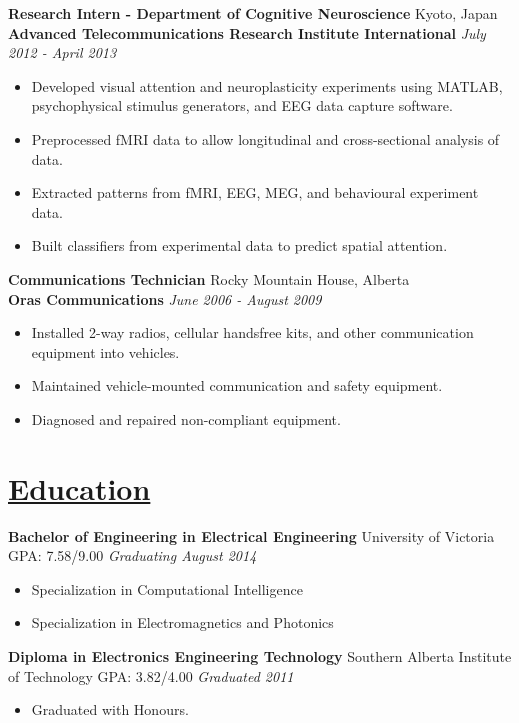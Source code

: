 \documentclass[a4paper, 11pt]{article}
\begin{document}
  \textbf{Research Intern - Department of Cognitive Neuroscience}
  \hfill
  Kyoto, Japan\\
  \textbf{Advanced Telecommunications Research Institute International}
  \hfill
  \emph{July 2012 - April 2013}
  \begin{itemize}[nosep]
    \item Developed visual attention and neuroplasticity experiments using MATLAB, psychophysical stimulus generators, and EEG data capture software.
    \item Preprocessed fMRI data to allow longitudinal and cross-sectional analysis of data.
    \item Extracted patterns from fMRI, EEG, MEG, and behavioural experiment data.
    \item Built classifiers from experimental data to predict spatial attention.
  \end{itemize}
  \medskip

  \textbf{Communications Technician}
  \hfill
  Rocky Mountain House, Alberta \\
  \textbf{Oras Communications}
  \hfill
  \emph{June 2006 - August 2009}
  \begin{itemize}[nosep]
  \item Installed 2-way radios, cellular handsfree kits, and other communication equipment into vehicles.
  \item Maintained vehicle-mounted communication and safety equipment.
  \item Diagnosed and repaired non-compliant equipment.
  \end{itemize}  

\newpage
\section{\underline{Education}}
  \textbf{Bachelor of Engineering in Electrical Engineering}
  \hfill
  University of Victoria\\
  GPA: 7.58/9.00
  \hfill
  \emph{Graduating August 2014}
  \begin{itemize}[nosep]
    \item Specialization in Computational Intelligence
    \item Specialization in Electromagnetics and Photonics
  \end{itemize}
  \medskip
  
  \textbf{Diploma in Electronics Engineering Technology}
  \hfill
  Southern Alberta Institute of Technology
  GPA: 3.82/4.00
  \hfill
  \emph{Graduated 2011}
  \begin{itemize}[nosep]
    \item Graduated with Honours.
  \end{itemize}
  \medskip
  
\end{document}
